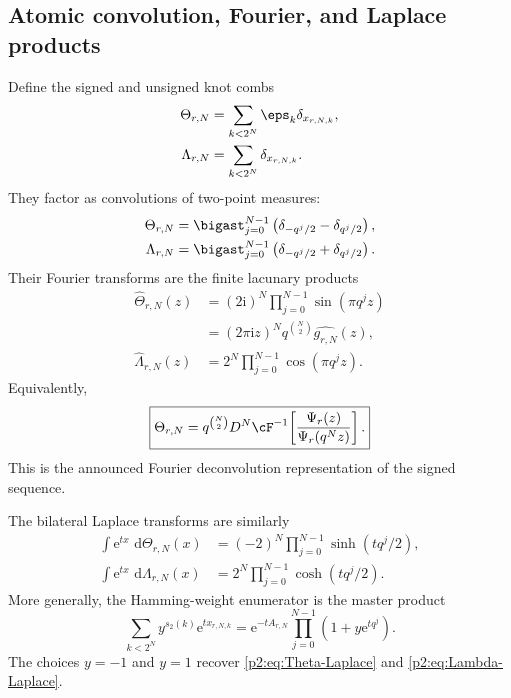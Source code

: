 \documentclass[11pt,oneside]{article}
\theoremstyle{definition}
\newcommand{\dd}{\,\mathrm d}
\newcommand{\e}{\mathrm e}
\newcommand{\ii}{\mathrm i}
\begin{document}
\subsection{Atomic convolution, Fourier, and Laplace products}

Define the signed and unsigned knot combs
\begin{align}
 \Theta_{r,N}&=\sum_{k<2^N}\eps_k\delta_{x_{r,N,k}},       \label{p2:eq:Theta-rN}\\
 \Lambda_{r,N}&=\sum_{k<2^N}\delta_{x_{r,N,k}}.           \label{p2:eq:Lambda-rN}
\end{align}
They factor as convolutions of two-point measures:
\begin{align}
 \Theta_{r,N}
 &=\bigast_{j=0}^{N-1}
   \left(\delta_{-q^j/2}-\delta_{q^j/2}\right),           \label{p2:eq:Theta-convolution}\\
 \Lambda_{r,N}
 &=\bigast_{j=0}^{N-1}
   \left(\delta_{-q^j/2}+\delta_{q^j/2}\right).           \label{p2:eq:Lambda-convolution}
\end{align}
Their Fourier transforms are the finite lacunary products
\begin{align}
 \widehat\Theta_{r,N}(z)
 &=(2\ii)^N\prod_{j=0}^{N-1}\sin(\pi q^jz)                \label{p2:eq:Theta-Fourier}\\
 &=(2\pi\ii z)^Nq^{\binom N2}\widehat{g_{r,N}}(z),       \label{p2:eq:Theta-Fourier-spline}\\
 \widehat\Lambda_{r,N}(z)
 &=2^N\prod_{j=0}^{N-1}\cos(\pi q^jz).                   \label{p2:eq:Lambda-Fourier}
\end{align}
Equivalently,
\begin{equation}
 \boxed{\displaystyle
 \Theta_{r,N}=q^{\binom N2}D^N\cF^{-1}\!\left[
   \frac{\Psi_r(z)}{\Psi_r(q^Nz)}\right].}               \label{p2:eq:TM-Fourier-deconvolution}
\end{equation}
This is the announced Fourier deconvolution representation of the signed
sequence.

The bilateral Laplace transforms are similarly
\begin{align}
 \int\e^{tx}\,\dd\Theta_{r,N}(x)
 &=(-2)^N\prod_{j=0}^{N-1}\sinh(tq^j/2),                  \label{p2:eq:Theta-Laplace}\\
 \int\e^{tx}\,\dd\Lambda_{r,N}(x)
 &=2^N\prod_{j=0}^{N-1}\cosh(tq^j/2).                    \label{p2:eq:Lambda-Laplace}
\end{align}
More generally, the Hamming-weight enumerator is the master product
\begin{equation}
 \sum_{k<2^N}y^{s_2(k)}\e^{t x_{r,N,k}}
 =\e^{-tA_{r,N}}\prod_{j=0}^{N-1}(1+y\e^{tq^j}).          \label{p2:eq:master-knot-enumerator}
\end{equation}
The choices $y=-1$ and $y=1$ recover
\eqref{p2:eq:Theta-Laplace} and \eqref{p2:eq:Lambda-Laplace}.
\end{document}
